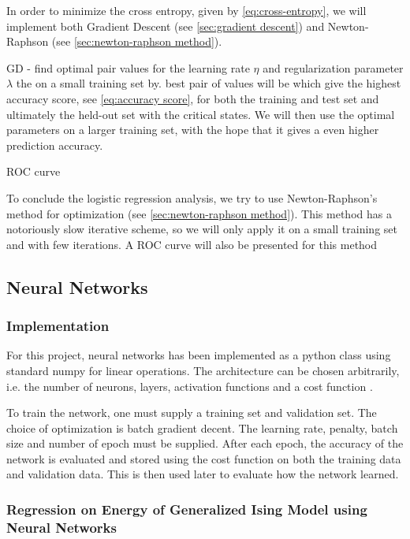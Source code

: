 In order to minimize the cross entropy, given by \autoref{eq:cross-entropy}, we will implement both Gradient Descent (see \autoref{sec:gradient descent}) and Newton-Raphson (see \autoref{sec:newton-raphson method}). 

GD - find optimal pair values for the learning rate $\eta$ and regularization parameter $\lambda$ the on a small training set by. best pair of values will be which give the highest accuracy score, see \autoref{eq:accuracy score}, for both the training and test set and ultimately the held-out set with the critical states. We will then use the optimal parameters on a larger training set, with the hope that it gives a even higher prediction accuracy.

ROC curve


To conclude the logistic regression analysis, we try to use Newton-Raphson's method for optimization (see \autoref{sec:newton-raphson method}). This method has a notoriously slow iterative scheme, so we will only apply it on a small training set and with few iterations. A ROC curve will also be presented for this method

\subsection{Neural Networks}\label{sec:method NN}
\subsubsection{Implementation}
For this project, neural networks has been implemented as a python class using standard numpy for linear operations. The architecture can be chosen arbitrarily, i.e. the number of neurons, layers, activation functions and a cost function .

To train the network, one must supply a training set and validation set. The choice of optimization is batch gradient decent. The learning rate, penalty, batch size and number of epoch must be supplied. After each epoch, the accuracy of the network is evaluated and stored using the cost function on both the training data and validation data. This is then used later to evaluate how the network learned.

\subsubsection{Regression on Energy of Generalized Ising Model using Neural 
Networks}

